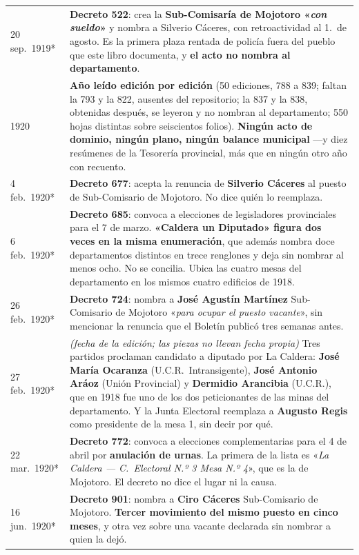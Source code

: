 \begin{longtable}{@{}p{2.7cm}p{10.3cm}@{}}
20 sep.\ 1919* & \textbf{Decreto 522}: crea la \textbf{Sub-Comisaría de Mojotoro «\textit{con sueldo}»} y nombra a Silverio Cáceres, con retroactividad al 1.\ de agosto. Es la primera plaza rentada de policía fuera del pueblo que este libro documenta, y \textbf{el acto no nombra al departamento}. \\
1920 & \textbf{Año leído edición por edición} (50 ediciones, 788 a 839; faltan la 793 y la 822, ausentes del repositorio; la 837 y la 838, obtenidas después, se leyeron y no nombran al departamento; 550 hojas distintas sobre seiscientos folios). \textbf{Ningún acto de dominio, ningún plano, ningún balance municipal} ---y diez resúmenes de la Tesorería provincial, más que en ningún otro año con recuento. \\
4 feb.\ 1920* & \textbf{Decreto 677}: acepta la renuncia de \textbf{Silverio Cáceres} al puesto de Sub-Comisario de Mojotoro. No dice quién lo reemplaza. \\
6 feb.\ 1920* & \textbf{Decreto 685}: convoca a elecciones de legisladores provinciales para el 7 de marzo. \textbf{«Caldera un Diputado» figura dos veces en la misma enumeración}, que además nombra doce departamentos distintos en trece renglones y deja sin nombrar al menos ocho. No se concilia. Ubica las cuatro mesas del departamento en los mismos cuatro edificios de 1918. \\
26 feb.\ 1920* & \textbf{Decreto 724}: nombra a \textbf{José Agustín Martínez} Sub-Comisario de Mojotoro «\textit{para ocupar el puesto vacante}», sin mencionar la renuncia que el Boletín publicó tres semanas antes. \\
27 feb.\ 1920* & \textit{(fecha de la edición; las piezas no llevan fecha propia)} Tres partidos proclaman candidato a diputado por La Caldera: \textbf{José María Ocaranza} (U.C.R.\ Intransigente), \textbf{José Antonio Aráoz} (Unión Provincial) y \textbf{Dermidio Arancibia} (U.C.R.), que en 1918 fue uno de los dos peticionantes de las minas del departamento. Y la Junta Electoral reemplaza a \textbf{Augusto Regis}\index{Regis, Augusto} como presidente de la mesa 1, sin decir por qué. \\
22 mar.\ 1920* & \textbf{Decreto 772}: convoca a elecciones complementarias para el 4 de abril por \textbf{anulación de urnas}. La primera de la lista es «\textit{La Caldera --- C.\ Electoral N.º 3 Mesa N.º 4}», que es la de Mojotoro. El decreto no dice el lugar ni la causa. \\
16 jun.\ 1920* & \textbf{Decreto 901}: nombra a \textbf{Ciro Cáceres} Sub-Comisario de Mojotoro. \textbf{Tercer movimiento del mismo puesto en cinco meses}, y otra vez sobre una vacante declarada sin nombrar a quien la dejó. \\

\end{longtable}
